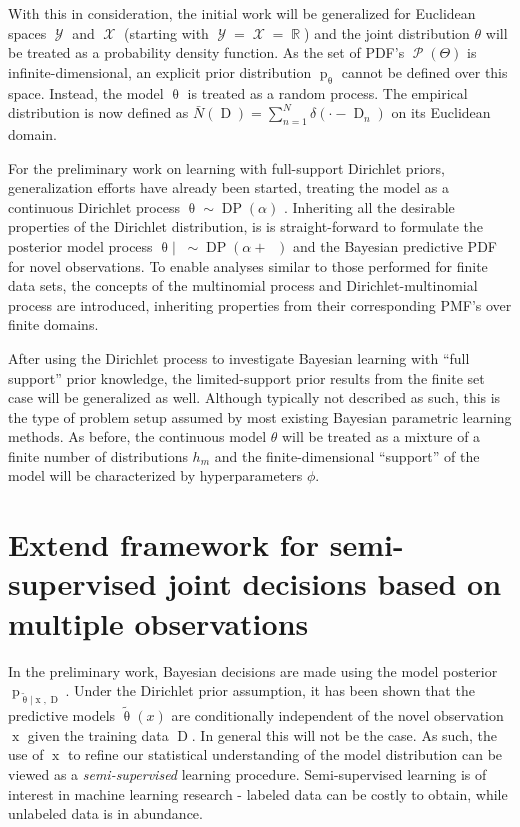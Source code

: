 \documentclass[12pt]{report}
\DeclareMathOperator{\xrm}{\mathrm{x}}
\DeclareMathOperator{\Drm}{\mathrm{D}}
\DeclareMathOperator{\nbarrm}{\bar{\mathrm{n}}}
\DeclareMathOperator{\prm}{\mathrm{p}}
\DeclareMathOperator{\Xcal}{\mathcal{X}}
\DeclareMathOperator{\Ycal}{\mathcal{Y}}
\DeclareMathOperator{\Pcal}{\mathcal{P}}
\DeclareMathOperator{\Rbb}{\mathbb{R}}
\DeclareMathOperator{\DP}{\mathrm{DP}}
\begin{document}
With this in consideration, the initial work will be generalized for Euclidean spaces $\Ycal$ and $\Xcal$ (starting with $\Ycal = \Xcal = \Rbb$) and the joint distribution $\theta$ will be treated as a probability density function. As the set of PDF's $\Pcal(\Theta)$ is infinite-dimensional, an explicit prior distribution $\prm_{\uptheta}$ cannot be defined over this space. Instead, the model $\uptheta$ is treated as a random process. The empirical distribution is now defined as $\bar{N}(\Drm) = \sum_{n=1}^N \delta\left( \cdot - \Drm_n \right)$ on its Euclidean domain.

For the preliminary work on learning with full-support Dirichlet priors, generalization efforts have already been started, treating the model as a continuous Dirichlet process $\uptheta \sim \DP(\alpha)$ \cite{bishop}. Inheriting all the desirable properties of the Dirichlet distribution, is is straight-forward to formulate the posterior model process $\uptheta | \nbarrm \sim \DP(\alpha+\nbarrm)$ and the Bayesian predictive PDF for novel observations. To enable analyses similar to those performed for finite data sets, the concepts of the multinomial process and Dirichlet-multinomial process are introduced, inheriting properties from their corresponding PMF's over finite domains. 

After using the Dirichlet process to investigate Bayesian learning with ``full support'' prior knowledge, the limited-support prior results from the finite set case will be generalized as well. Although typically not described as such, this is the type of problem setup assumed by most existing Bayesian parametric learning methods. As before, the continuous model $\theta$ will be treated as a mixture of a finite number of distributions $h_m$ and the finite-dimensional ``support'' of the model will be characterized by hyperparameters $\phi$.




\section{Extend framework for semi-supervised joint decisions based on multiple observations}

In the preliminary work, Bayesian decisions are made using the model posterior $\prm_{\tilde{\uptheta} | \xrm,\Drm}$. Under the Dirichlet prior assumption, it has been shown that the predictive models $\tilde{\uptheta}(x)$ are conditionally independent of the novel observation $\xrm$ given the training data $\Drm$. In general this will not be the case. As such, the use of $\xrm$ to refine our statistical understanding of the model distribution can be viewed as a \emph{semi-supervised} learning procedure. Semi-supervised learning is of interest in machine learning research - labeled data can be costly to obtain, while unlabeled data is in abundance. 
\end{document}
